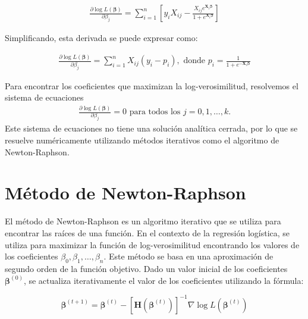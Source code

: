 \begin{eqnarray}\label{Eq.1.14}
\frac{\partial \log L(\boldsymbol{\beta})}{\partial \beta_j} = \sum_{i=1}^{n} \left[ y_i X_{ij} - \frac{X_{ij} e^{\mathbf{X}_i \boldsymbol{\beta}}}{1 + e^{\mathbf{X}_i \boldsymbol{\beta}}} \right]
\end{eqnarray}

Simplificando, esta derivada se puede expresar como:

\begin{eqnarray}\label{Eq.PrimeraDerivada}
\frac{\partial \log L(\boldsymbol{\beta})}{\partial \beta_j} = \sum_{i=1}^{n} X_{ij} (y_i - p_i),\textrm{ donde }p_i = \frac{1}{1 + e^{-\mathbf{X}_i \boldsymbol{\beta}}}
\end{eqnarray}

Para encontrar los coeficientes que maximizan la log-verosimilitud, resolvemos el sistema de ecuaciones 
\begin{eqnarray*}
\frac{\partial \log L(\boldsymbol{\beta})}{\partial \beta_j} = 0 \textrm{ para todos los }j = 0, 1, \ldots, k. 
\end{eqnarray*}
Este sistema de ecuaciones no tiene una solución analítica cerrada, por lo que se resuelve numéricamente utilizando métodos iterativos como el algoritmo de Newton-Raphson.

\section{Método de Newton-Raphson}

El método de Newton-Raphson es un algoritmo iterativo que se utiliza para encontrar las raíces de una función. En el contexto de la regresión logística, se utiliza para maximizar la función de log-verosimilitud encontrando los valores de los coeficientes $\beta_0, \beta_1, \ldots, \beta_n$. Este m\'etodo se basa en una aproximación de segundo orden de la función objetivo. Dado un valor inicial de los coeficientes $\boldsymbol{\beta}^{(0)}$, se actualiza iterativamente el valor de los coeficientes utilizando la fórmula:

\begin{equation}\label{Eq.Criterio0}
\boldsymbol{\beta}^{(t+1)} = \boldsymbol{\beta}^{(t)} - \left[ \mathbf{H}(\boldsymbol{\beta}^{(t)}) \right]^{-1} \nabla \log L(\boldsymbol{\beta}^{(t)})
\end{equation}

